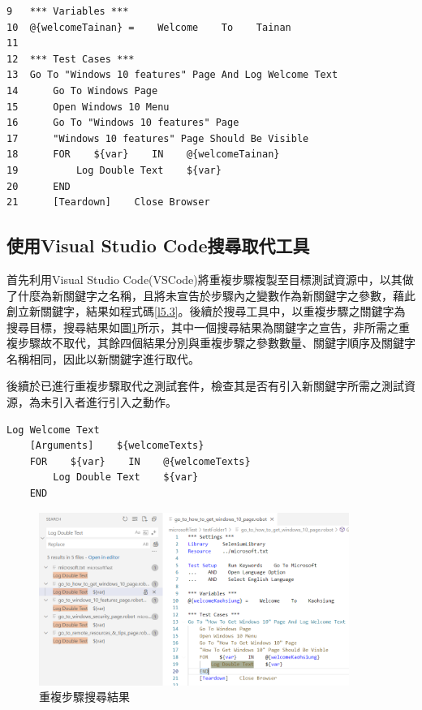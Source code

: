 \begin{lstlisting}[caption=前往Windows10功能頁面之測試套件, label={l5.2}]
9   *** Variables ***
10  @{welcomeTainan} =    Welcome    To    Tainan
11
12  *** Test Cases ***
13  Go To "Windows 10 features" Page And Log Welcome Text
14      Go To Windows Page
15      Open Windows 10 Menu
16      Go To "Windows 10 features" Page
17      "Windows 10 features" Page Should Be Visible
18      FOR    ${var}    IN    @{welcomeTainan}
19          Log Double Text    ${var}
20      END
21      [Teardown]    Close Browser
\end{lstlisting}
\newpage

\subsection{使用Visual Studio Code搜尋取代工具}\label{s5.1.1}
\indent
首先利用Visual Studio Code(VSCode)將重複步驟複製至目標測試資源中，以其做了什麼為新關鍵字之名稱，且將未宣告於步驟內之變數作為新關鍵字之參數，藉此創立新關鍵字，結果如程式碼\ref{l5.3}。後續於搜尋工具中，以重複步驟之關鍵字為搜尋目標，搜尋結果如圖\ref{f5.1}所示，其中一個搜尋結果為關鍵字之宣告，非所需之重複步驟故不取代，其餘四個結果分別與重複步驟之參數數量、關鍵字順序及關鍵字名稱相同，因此以新關鍵字進行取代。

\indent
後續於已進行重複步驟取代之測試套件，檢查其是否有引入新關鍵字所需之測試資源，為未引入者進行引入之動作。

\begin{lstlisting}[caption=新關鍵字架構, label={l5.3}]
Log Welcome Text
    [Arguments]    ${welcomeTexts}
    FOR    ${var}    IN    @{welcomeTexts}
        Log Double Text    ${var}
    END
\end{lstlisting}

\begin{figure}[H]
   \centering
   \includegraphics[width=0.9\textwidth]{picture/ch5/vscode_search_in_case1.PNG}
   \caption{重複步驟搜尋結果}
   \label{f5.1}
\end{figure}

